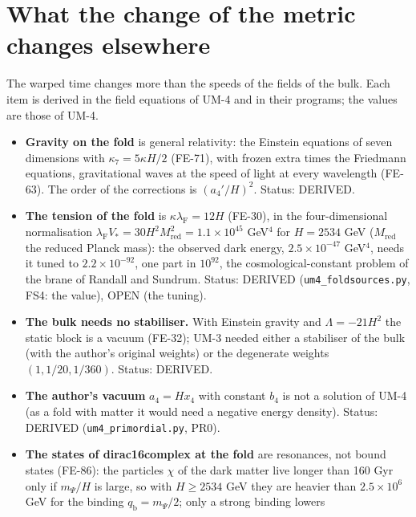 \documentclass[
  10pt,
]{article}
\providecommand{\tightlist}{%
  \setlength{\itemsep}{0pt}\setlength{\parskip}{0pt}}
\begin{document}
\hypertarget{what-the-change-of-the-metric-changes-elsewhere}{%
\section{What the change of the metric changes
elsewhere}\label{what-the-change-of-the-metric-changes-elsewhere}}

The warped time changes more than the speeds of the fields of the bulk.
Each item is derived in the field equations of UM-4 and in their
programs; the values are those of UM-4.

\begin{itemize}
\tightlist
\item
  \textbf{Gravity on the fold} is general relativity: the Einstein
  equations of seven dimensions with \(\kappa_7 = 5\kappa H/2\) (FE-71),
  with frozen extra times the Friedmann equations, gravitational waves
  at the speed of light at every wavelength (FE-63). The order of the
  corrections is \((a_4'/H)^2\). Status: DERIVED.
\item
  \textbf{The tension of the fold} is
  \(\kappa\lambda_{\mathrm{F}} = 12H\) (FE-30), in the four-dimensional
  normalisation
  \(\lambda_{\mathrm{F}}V_* = 30H^2M_{\mathrm{red}}^2 = 1.1\times10^{45}\)
  GeV\(^4\) for \(H = 2534\) GeV (\(M_{\mathrm{red}}\) the reduced
  Planck mass): the observed dark energy, \(2.5\times10^{-47}\)
  GeV\(^4\), needs it tuned to \(2.2\times10^{-92}\), one part in
  \(10^{92}\), the cosmological-constant problem of the brane of Randall
  and Sundrum. Status: DERIVED (\texttt{um4\_foldsources.py}, FS4: the
  value), OPEN (the tuning).
\item
  \textbf{The bulk needs no stabiliser.} With Einstein gravity and
  \(\Lambda = -21H^2\) the static block is a vacuum (FE-32); UM-3 needed
  either a stabiliser of the bulk (with the author's original weights)
  or the degenerate weights \((1, 1/20, 1/360)\). Status: DERIVED.
\item
  \textbf{The author's vacuum} \(a_4 = Hx_4\) with constant \(b_4\) is
  not a solution of UM-4 (as a fold with matter it would need a negative
  energy density). Status: DERIVED (\texttt{um4\_primordial.py}, PR0).
\item
  \textbf{The states of dirac16complex at the fold} are resonances, not
  bound states (FE-86): the particles \(\chi\) of the dark matter live
  longer than 160 Gyr only if \(m_\Psi/H\) is large, so with
  \(H \ge 2534\) GeV they are heavier than \(2.5\times10^6\) GeV for the
  binding \(q_{\mathrm{b}} = m_\Psi/2\); only a strong binding lowers

\end{itemize}
\end{document}
